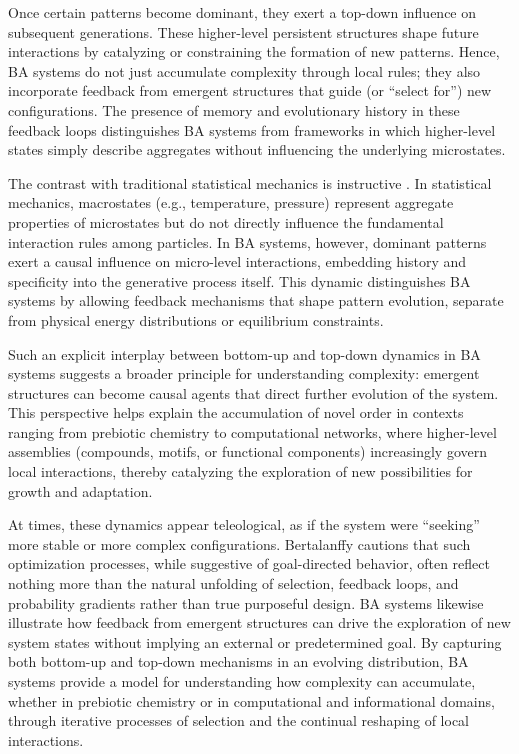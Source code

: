 \documentclass[preprint,12pt]{elsarticle}
\begin{document}
Once certain patterns become dominant, they exert a top-down influence on subsequent generations. These higher-level persistent structures shape future interactions by catalyzing or constraining the formation of new patterns. Hence, BA systems do not just accumulate complexity through local rules; they also incorporate feedback from emergent structures that guide (or ``select for'') new configurations. The presence of memory and evolutionary history in these feedback loops distinguishes BA systems from frameworks in which higher-level states simply describe aggregates without influencing the underlying microstates.

The contrast with traditional statistical mechanics is instructive \cite{landau1980statistical}. In statistical mechanics, macrostates (e.g., temperature, pressure) represent aggregate properties of microstates but do not directly influence the fundamental interaction rules among particles. In BA systems, however, dominant patterns exert a causal influence on micro-level interactions, embedding history and specificity into the generative process itself. This dynamic distinguishes BA systems by allowing feedback mechanisms that shape pattern evolution, separate from physical energy distributions or equilibrium constraints.

Such an explicit interplay between bottom-up and top-down dynamics in BA systems suggests a broader principle for understanding complexity: emergent structures can become causal agents that direct further evolution of the system. This perspective helps explain the accumulation of novel order in contexts ranging from prebiotic chemistry to computational networks, where higher-level assemblies (compounds, motifs, or functional components) increasingly govern local interactions, thereby catalyzing the exploration of new possibilities for growth and adaptation.

At times, these dynamics appear teleological, as if the system were ``seeking'' more stable or more complex configurations. Bertalanffy \cite{bertalanffy1968general} cautions that such optimization processes, while suggestive of goal-directed behavior, often reflect nothing more than the natural unfolding of selection, feedback loops, and probability gradients rather than true purposeful design. BA systems likewise illustrate how feedback from emergent structures can drive the exploration of new system states without implying an external or predetermined goal. By capturing both bottom-up and top-down mechanisms in an evolving distribution, BA systems provide a model for understanding how complexity can accumulate, whether in prebiotic chemistry or in computational and informational domains, through iterative processes of selection and the continual reshaping of local interactions.
\end{document}
